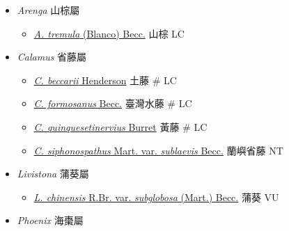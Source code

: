 
  \begin{itemize}
 \item[] \textit{Arenga} 山棕屬
                                
  \begin{itemize}
        \item[] \href{http://www.theplantlist.org/tpl1.1/search?q=Arenga+tremula}{\textit{A. tremula} (Blanco) Becc.}   山棕   LC
  \end{itemize}
 \item[] \textit{Calamus} 省藤屬
                                
  \begin{itemize}
        \item[] \href{http://www.theplantlist.org/tpl1.1/search?q=Calamus+beccarii}{\textit{C. beccarii} Henderson}   土藤  \# LC
        \item[] \href{http://www.theplantlist.org/tpl1.1/search?q=Calamus+formosanus}{\textit{C. formosanus} Becc.}   臺灣水藤  \# LC
        \item[] \href{http://www.theplantlist.org/tpl1.1/search?q=Calamus+quinquesetinervius}{\textit{C. quinquesetinervius} Burret}   黃藤  \# LC
        \item[] \href{http://www.theplantlist.org/tpl1.1/search?q=Calamus+siphonospathus+var.+sublaevis}{\textit{C. siphonospathus} Mart. var. \textit{sublaevis} Becc.}   蘭嶼省藤   NT
  \end{itemize}
 \item[] \textit{Livistona} 蒲葵屬
                                
  \begin{itemize}
        \item[] \href{http://www.theplantlist.org/tpl1.1/search?q=Livistona+chinensis+var.+subglobosa}{\textit{L. chinensis} R.Br. var. \textit{subglobosa} (Mart.) Becc.}   蒲葵   VU
  \end{itemize}
 \item[] \textit{Phoenix} 海棗屬
                                

\end{itemize}
